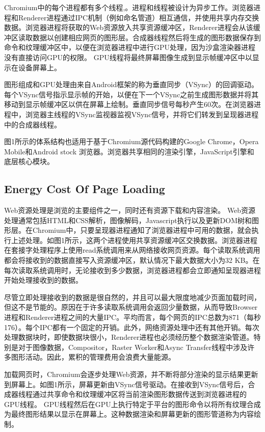 \documentclass[sigconf]{acmart}
\begin{document}
Chromium中的每个进程都有多个线程,。进程和线程被设计为异步工作。浏览器进程和Renderer进程通过IPC机制（例如命名管道）相互通信，并使用共享内存交换数据。浏览器进程将获取的Web资源放入共享资源缓冲区，Renderer进程会从该缓冲区读取数据以创建相应网页的图形层。合成器线程然后将生成的图形数据保存到命令和纹理缓冲区中，以便在浏览器进程中进行GPU处理，因为沙盒渲染器进程没有直接访问GPU的权限。 GPU线程将最终屏幕图像生成到显示帧缓冲区中以显示在设备屏幕上。

图形组成和GPU处理由来自Android框架的称为垂直同步（VSync）的回调驱动。每个VSync信号指示显示帧的开始，以便在下一个VSync之前生成图形数据并将其移动到显示帧缓冲区以供在屏幕上绘制。垂直同步信号每秒产生60次。在浏览器进程中，浏览器主线程的VSync监视器监视VSync信号，并将它们转发到呈现器进程中的合成器线程。

图1所示的体系结构也适用于基于Chromium源代码构建的Google Chrome，Opera Mobile和Android stock 浏览器\cite{6}\cite{19}。浏览器共享相同的渲染引擎，JavaScript引擎和底层核心模块。

\subsection{Energy Cost Of Page Loading}

Web资源处理是浏览的主要组件之一，同时还有资源下载和内容渲染。 Web资源处理通常包括HTML和CSS解析，图像解码，Javascript执行以及更新DOM树和图形层。在Chromium中，只要呈现器进程通知了浏览器进程中可用的数据，就会执行上述处理。如图1所示，这两个进程使用共享资源缓冲区交换数据。浏览器进程在套接字处理程序上使用read系统调用来从网络接收网页资源。每个读取系统调用都会将接收到的数据直接写入资源缓冲区，默认情况下最大数据大小为32 KB。在每次读取系统调用时，无论接收到多少数据，浏览器进程都会立即通知呈现器进程开始处理接收到的数据。

尽管立即处理接收到的数据是很自然的，并且可以最大限度地减少页面加载时间，但这不是节能的。原因在于许多读取系统调用会返回少量数据，从而导致Browser进程和Renderer进程之间的大量IPC。平均而言，每个网页的IPC总数为871（每秒176）。每个IPC都有一个固定的开销。此外，网络资源处理中还有其他开销。每次处理数据块时，即使数据块很小，Renderer进程也必须经历整个数据渲染管道。特别是对于图像数据，Compositor，Raster Worker和Async Transfer线程中涉及许多图形活动。因此，累积的管理费用会浪费大量能源。

加载网页时，Chromium会逐步处理Web资源，并不断将部分渲染的显示结果更新到屏幕上。如图1所示，屏幕更新由VSync信号驱动。在接收到VSync信号后，合成器线程通过共享命令和纹理缓冲区将当前渲染图形数据传送到浏览器进程的GPU线程。 GPU线程然后在GPU上执行特定于平台的图形命令以将所有纹理合成为最终图形结果以显示在屏幕上。这种数据渲染和屏幕更新的图形管道称为内容绘制。
\end{document}

